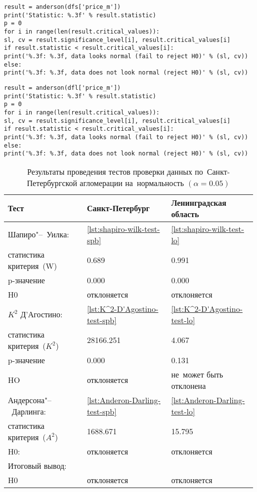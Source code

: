 \documentclass[]{scrreprt}
\begin{document}
%
\begin{lstlisting}[float, caption = Тест Андерсона-Дарлинга для~данных по~Санкт-Петербургу, firstnumber=1, label= lst:Anderon-Darling-test-spb]
result = anderson(dfs['price_m'])
print('Statistic: %.3f' % result.statistic)
p = 0
for i in range(len(result.critical_values)):
sl, cv = result.significance_level[i], result.critical_values[i]
if result.statistic < result.critical_values[i]:
print('%.3f: %.3f, data looks normal (fail to reject H0)' % (sl, cv))
else:
print('%.3f: %.3f, data does not look normal (reject H0)' % (sl, cv))
\end{lstlisting}
%
\begin{lstlisting}[float, caption = Тест Андерсона-Дарлинга для~данных по~Ленинградской области, firstnumber=1, label= lst:Anderon-Darling-test-lo]
result = anderson(dfl['price_m'])
print('Statistic: %.3f' % result.statistic)
p = 0
for i in range(len(result.critical_values)):
sl, cv = result.significance_level[i], result.critical_values[i]
if result.statistic < result.critical_values[i]:
print('%.3f: %.3f, data looks normal (fail to reject H0)' % (sl, cv))
else:
print('%.3f: %.3f, data does not look normal (reject H0)' % (sl, cv))
\end{lstlisting}  
%
\begin{table}[ht]
	\caption{Результаты проведения тестов проверки данных по~Санкт-Петербургской агломерации на~нормальность $({\textstyle \alpha=0.05})$}\label{tab:normality-tests-values}
	\centering
	\begin{tabular}{lll}
		\hline
		Тест&Санкт-Петербург&Ленинградская область\\
		\hline
		Шапиро"--~Уилка:&\ref{lst:shapiro-wilk-test-spb}&\ref{lst:shapiro-wilk-test-lo}\\
		статистика критерия~(W)&0.689&0.991\\
		p-значение&0.000&0.000\\
		H0&отклоняется&отклоняется\\
		\hline
		${\textstyle K^{2}}$ Д'Агостино:&\ref{lst:K^2-D'Agostino-test-spb}&\ref{lst:K^2-D'Agostino-test-lo}\\
		статистика критерия~(${\textstyle K^{2}}$)&28166.251&4.067\\
		p-значение&0.000&0.131\\
		HO&отклоняется&не~может быть отклонена\\
		\hline
		Андерсона"--~Дарлинга:&\ref{lst:Anderon-Darling-test-spb}&\ref{lst:Anderon-Darling-test-lo}\\
		статистика критерия~(${\textstyle A^{2}}$)&1688.671&15.795\\
		H0:&отклоняется&отклоняется\\
		\hline
		Итоговый вывод:&&\\
		H0&отклоняется&отклоняется\\
		\hline
	\end{tabular}
\end{table}
\end{document}
